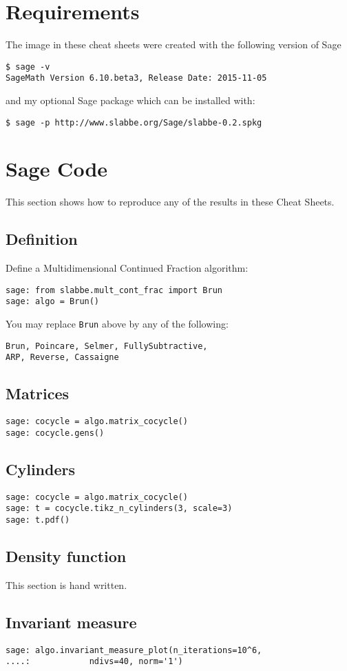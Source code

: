 \section{Requirements}
The image in these cheat sheets were created with the 
following version of Sage \cite{sage}
\begin{verbatim}
$ sage -v
SageMath Version 6.10.beta3, Release Date: 2015-11-05
\end{verbatim}
and my optional Sage package which can be installed with:
\begin{verbatim}
$ sage -p http://www.slabbe.org/Sage/slabbe-0.2.spkg
\end{verbatim}
\section{Sage Code}
This section shows how to reproduce any of the results in these Cheat Sheets.
\subsection{Definition}
Define a Multidimensional Continued Fraction algorithm:
\begin{verbatim}
sage: from slabbe.mult_cont_frac import Brun
sage: algo = Brun()
\end{verbatim}
You may replace \texttt{Brun} above by any of the following:
\begin{verbatim}
Brun, Poincare, Selmer, FullySubtractive, 
ARP, Reverse, Cassaigne
\end{verbatim}
\subsection{Matrices}
\begin{verbatim}
sage: cocycle = algo.matrix_cocycle()
sage: cocycle.gens()
\end{verbatim}
\subsection{Cylinders}
\begin{verbatim}
sage: cocycle = algo.matrix_cocycle()
sage: t = cocycle.tikz_n_cylinders(3, scale=3)
sage: t.pdf()
\end{verbatim}
\subsection{Density function}
This section is hand written.
\subsection{Invariant measure}
\begin{verbatim}
sage: algo.invariant_measure_plot(n_iterations=10^6,
....:            ndivs=40, norm='1')
\end{verbatim}
